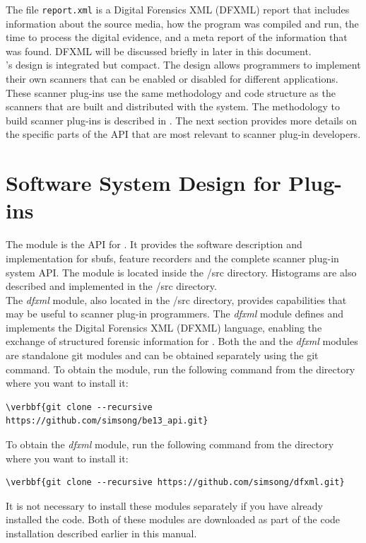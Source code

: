 \documentclass[11pt,fleqn]{article} %
\begin{document}
The file \texttt{report.xml} is a Digital Forensics XML (DFXML) report that includes information about the source media, how the \bulk program was compiled and run, the time to process the digital evidence, and a meta report of the information that was found. DFXML will be discussed briefly in \textbf{} \textbf{} later in this document. \\

\bulk 's design is integrated but compact. The design allows programmers to implement their own scanners that can be enabled or disabled for different \bulk applications. These scanner plug-ins use the same methodology and code structure as the scanners that are built and distributed with the \bulk system. The methodology to build scanner plug-ins is described in \textbf{} \textbf{}. The next section provides more details on the specific parts of the \bulk API that are most relevant to scanner plug-in developers. 

\section{Software System Design for Plug-ins}
\label{SoftwareDesign}

The module \beapi is the API for \bulk. It provides the software description and implementation for sbufs, feature recorders and the complete scanner plug-in system API. The \beapi module is located inside the /src directory. Histograms are also described and implemented in the /src directory. \\

The \textit{dfxml} module, also located in the /src directory, provides capabilities that may be useful to scanner plug-in programmers. The \textit{dfxml}  module defines and implements the Digital Forensics XML (DFXML) language, enabling the exchange of structured forensic information for \bulk. Both the \beapi and the \textit{dfxml} modules are standalone git modules and can be obtained separately using the git command. To obtain the \beapi module, run the following command from the directory where you want to install it:
\begin{Verbatim}[commandchars=\\\{\}]
\verbbf{git clone --recursive  https://github.com/simsong/be13_api.git}
\end{Verbatim}
To obtain the \textit{dfxml} module, run the following command from the directory where you want to install it:
\begin{Verbatim}[commandchars=\\\{\}]
\verbbf{git clone --recursive https://github.com/simsong/dfxml.git}
\end{Verbatim}
It is not necessary to install these modules separately if you have already installed the \bulk code. Both of these modules are downloaded as part of the \bulk code installation described earlier in this manual. \\
\end{document}
